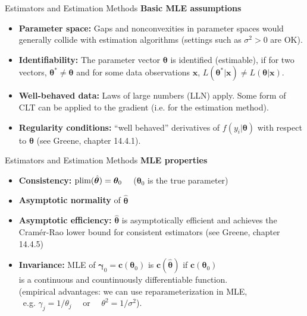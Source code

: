 \documentclass{beamer}
\begin{document}
\begin{frame}{Estimators and Estimation Methods}
\textbf{Basic MLE assumptions}\\
\begin{itemize}
    \item \textbf{Parameter space:} Gaps and nonconvexities in parameter spaces would generally collide with estimation algorithms (settings such as $\sigma^2 > 0$ are OK).
    \item \textbf{Identifiability:} The parameter vector $\bm{\theta}$ is identified (estimable), if for two vectors, $\bm{\theta}^{*} \neq \bm{\theta}$ and for some data observations $\bm{x}$, $L(\bm{\theta}^{*}|\bm{x}) \neq L(\bm{\theta}|\bm{x})$.
    \item \textbf{Well-behaved data:} Laws of large numbers (LLN) apply. Some form of CLT can be applied to the gradient (i.e. for the estimation method).
    \item \textbf{Regularity conditions:} ``well behaved'' derivatives of $f(y_i|\bm{\theta})$ with respect to $\bm{\theta}$ (see Greene, chapter 14.4.1).
\end{itemize}
\end{frame}
\begin{frame}{Estimators and Estimation Methods}
\textbf{MLE properties}\\
\begin{itemize}
    \item \textbf{Consistency:} $\textnormal{plim}(\hat{\bm{\theta}}) = \bm{\theta}_0$ ~~($\bm{\theta}_0$ is the true parameter)
    \medskip
    \item \textbf{Asymptotic normality} of $\bm{\hat{\theta}}$
    \medskip
    \item \textbf{Asymptotic efficiency:}  $\bm{\hat{\theta}}$ is asymptotically efficient and achieves the Cramér-Rao lower bound for consistent estimators (see Greene, chapter 14.4.5)
    \medskip
    \item \textbf{Invariance:} MLE of $\bm{\gamma}_0=\bm{c}(\bm{\theta}_0)$ is $\bm{c}(\bm{\hat{\theta}})$ if $\bm{c}(\bm{\theta}_0)$ \\is a continuous and countinuously differentiable function.\\ \smallskip \footnotesize{ 
    (empirical advantages: we can use reparameterization in MLE, \\~e.g. $\gamma_j = 1/\theta_j$ ~~or~~ $\theta^2 = 1/\sigma^2$).}
\end{itemize}
\end{frame}
\end{document}
